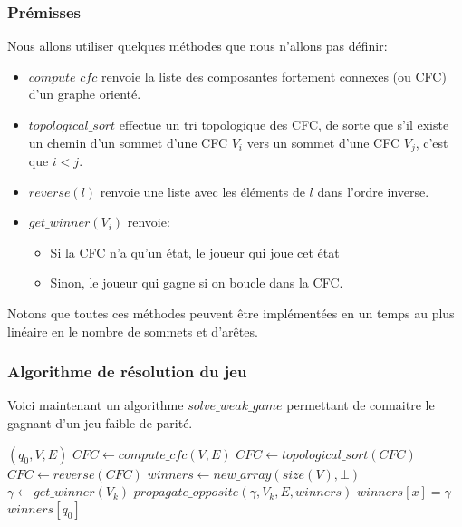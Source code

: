 \documentclass[10pt,a4paper]{article}
\begin{document}
\subsubsection{Prémisses}
Nous allons utiliser quelques méthodes que nous n'allons pas définir:
\begin{itemize}
	\item $compute\_cfc$ renvoie la liste des composantes fortement connexes (ou CFC) d'un graphe orienté.
	\item $topological\_sort$ effectue un tri topologique des CFC, de sorte que s'il existe un chemin d'un sommet d'une CFC $V_i$ vers un sommet d'une CFC $V_j$, c'est que $i < j$.
	\item $reverse(l)$ renvoie une liste avec les éléments de $l$ dans l'ordre inverse.
	\item $get\_winner(V_i)$ renvoie:
	\begin{itemize}
		\item Si la CFC n'a qu'un état, le joueur qui joue cet état
		\item Sinon, le joueur qui gagne si on boucle dans la CFC.
	\end{itemize}
\end{itemize}
Notons que toutes ces méthodes peuvent être implémentées en un temps au plus linéaire en le nombre de sommets et d'arêtes.

\subsubsection{Algorithme de résolution du jeu}
Voici maintenant un algorithme $solve\_weak\_game$ permettant de connaitre le gagnant d'un jeu faible de parité.

\begin{algorithm}
	\caption{$solve\_weak\_game$}
\begin{algorithmic}[1]
	\REQUIRE $(q_0, V, E)$ 
	\STATE $CFC \leftarrow compute\_cfc(V, E)$
	\STATE $CFC \leftarrow topological\_sort(CFC)$
	\STATE $CFC \leftarrow reverse(CFC)$
	\STATE $winners \leftarrow new\_array(size(V), \bot)$
		\STATE $\gamma \leftarrow get\_winner(V_k)$
		\STATE $propagate\_opposite(\gamma, V_k, E, winners)$
				\STATE $winners[x] = \gamma$
			\ENDIF
		\ENDFOR
	\ENDFOR
	\RETURN $winners[q_0]$
\end{algorithmic}
\end{algorithm}
\end{document}

